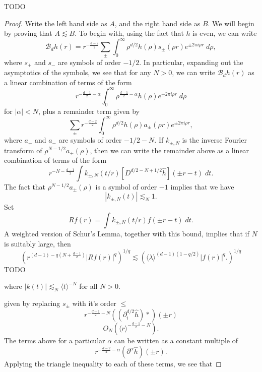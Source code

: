 \begin{theorem}
    TODO
\end{theorem}
\begin{proof}
    Write the left hand side as $A$, and the right hand side as $B$. We will begin by proving that $A \lesssim B$. To begin with, using the fact that $h$ is even, we can write
    \[ \mathcal{B}_d h(r) = r^{- \frac{d-2}{2}} \sum_{\pm} \int_0^\infty \rho^{d/2} h(\rho) s_{\pm}(\rho r) e^{\pm 2 \pi i \rho r}\; d\rho, \]
    where $s_+$ and $s_-$ are symbols of order $-1/2$. In particular, expanding out the asymptotics of the symbols, we see that for any $N > 0$, we can write $\mathcal{B}_d h(r)$ as a linear combination of terms of the form
    \[ r^{- \frac{d-1}{2} - \alpha} \int_0^\infty \rho^{\frac{d-1}{2} - \alpha} h(\rho) e^{\pm 2 \pi i \rho r}\; d\rho \]
    for $|\alpha| < N$, plus a remainder term given by
    \[ \sum_{\pm} r^{- \frac{d-2}{2}} \int_0^\infty \rho^{d/2} h(\rho) a_{\pm}(\rho r) e^{\pm 2 \pi i \rho r}, \]
    where $a_+$ and $a_-$ are symbols of order $-1/2 - N$. If $k_{\pm,N}$ is the inverse Fourier transform of $\rho^{N - 1/2} a_{\pm}(\rho)$, then we can write the remainder above as a linear combination of terms of the form
    \[ r^{- N - \frac{d-1}{2}} \int k_{\pm,N}(t / r) [D^{d/2 - N + 1/2} \widehat{h}](\pm r - t)\; dt. \]
    The fact that $\rho^{N-1/2} a_{\pm}(\rho)$ is a symbol of order $-1$ implies that we have
    \[ |k_{\pm,N}(t)| \lesssim_N 1. \]
    Set
    \[ Rf(r) = \int k_{\pm,N}(t/r) f(\pm r - t)\; dt. \]
    A weighted version of Schur's Lemma, together with this bound, implies that if $N$ is suitably large, then
    \[ \left( r^{(d-1) - q \left(N + \frac{d-1}{2} \right)} |Rf(r)|^q \right)^{1/q} \lesssim \left( \langle \lambda \rangle^{(d-1)(1 - q/2)} |f(r)|^q. \right)^{1/q} \]
    TODO


    where $|k(t)| \lesssim_N \langle t \rangle^{-N}$ for all $N > 0$.

     given by replacing $s_{\pm}$ with it's order $\leq $
    \[ r^{- \frac{d-1}{2} - N} \left( (\partial_i^{d/2} \widehat{h}) *  \right)(\pm r) \]
    \[ O_N \left( \langle r \rangle^{- \frac{d-1}{2} - N} \right). \]
    The terms above for a particular $\alpha$ can be written as a constant multiple of
    \[ r^{- \frac{d-2}{2} - \alpha} \left(\partial^\alpha \widehat{h} \right)(\pm r). \]
    Applying the triangle inequality to each of these terms, we see that
\end{proof}

